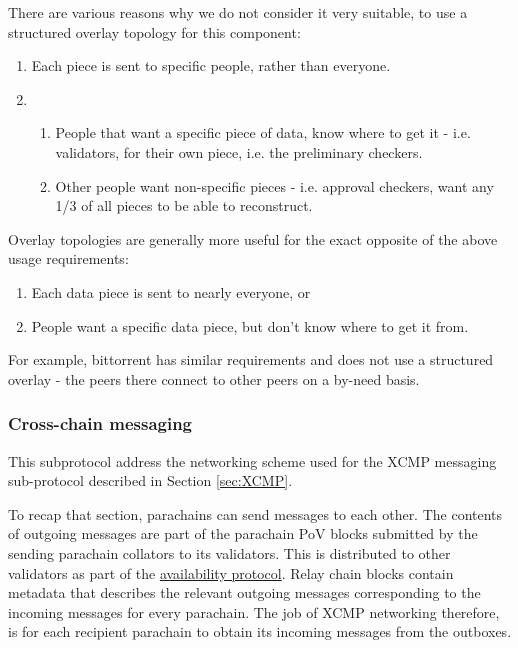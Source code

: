 There are various reasons why we do not consider it very suitable, to use a
structured overlay topology for this component:

\begin{enumerate}
\item Each piece is sent to specific people, rather than everyone.
\item
\begin{enumerate}
\item People that want a specific piece of data, know where to get it - i.e.
      validators, for their own piece, i.e. the preliminary checkers.
\item Other people want non-specific pieces - i.e. approval checkers,
      want any 1/3 of all pieces to be able to reconstruct.
\end{enumerate}
\end{enumerate}

Overlay topologies are generally more useful for the exact opposite of the
above usage requirements:

\begin{enumerate}
\item Each data piece is sent to nearly everyone, or
\item People want a specific data piece, but don't know where to get it from.
\end{enumerate}

For example, bittorrent has similar requirements and does not use a structured
overlay - the peers there connect to other peers on a by-need basis.

\subsubsection{Cross-chain messaging} \label{sec:net_crosschain}

This subprotocol address the networking scheme used for the XCMP messaging sub-protocol described in Section \ref{sec:XCMP}.

To recap that section, parachains can send messages to each other. The contents
of outgoing messages are part of the parachain PoV blocks submitted by the
sending parachain collators to its validators. This is distributed to other
validators as part of the \hyperref[sec:net_storage]{availability protocol}.
Relay chain blocks contain metadata that describes the relevant outgoing
messages corresponding to the incoming messages for every parachain. The job of
XCMP networking therefore, is for each recipient parachain to obtain its
incoming messages from the outboxes.

